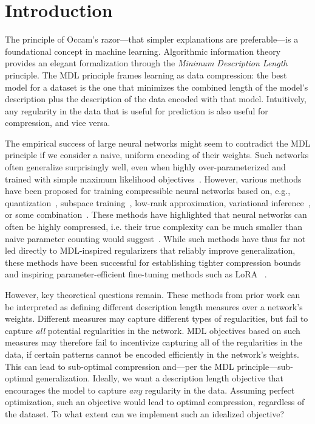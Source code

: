 \section{Introduction}


The principle of Occam's razor---that simpler explanations are preferable---is a foundational concept in machine learning. Algorithmic information theory provides an elegant formalization through the \emph{Minimum Description Length}~\citep[MDL;][]{rissanen1978modeling} principle. The MDL principle frames learning as data compression: the best model for a dataset is the one that minimizes the combined length of the model's description plus the description of the data encoded with that model. Intuitively, any regularity in the data that is useful for prediction is also useful for compression, and vice versa.

The empirical success of large neural networks might seem to contradict the MDL principle if we consider a naive, uniform encoding of their weights. Such networks often generalize surprisingly well, even when highly over-parameterized and trained with simple maximum likelihood objectives~\citep{zhang2017understanding}. However, various methods have been proposed for training compressible neural networks based on, e.g., quantization~\citep{han2016deep}, subspace training~\citep{li2018measuring}, low-rank approximation, variational inference~\citep{louizos2017bayesian,hinton1993keeping}, or some combination~\citep{lotfi2022pac,lotfi2024non,demoss2025complexity}. These methods have highlighted that neural networks can often be highly compressed, i.e. their true complexity can be much smaller than naive parameter counting would suggest~\citep{blier2018description}. While such methods have thus far not led directly to MDL-inspired regularizers that reliably improve generalization, these methods have been successful for establishing tighter compression bounds~\citep{lotfi2022pac,lotfi2024non} and inspiring parameter-efficient fine-tuning methods such as LoRA ~\citep{hu2022lora}.

However, key theoretical questions remain. These methods from prior work can be interpreted as defining different description length measures over a network's weights. Different measures may capture different types of regularities, but fail to capture \emph{all} potential regularities in the network. MDL objectives based on such measures may therefore fail to incentivize capturing all of the regularities in the data, if certain patterns cannot be encoded efficiently in the network's weights. This can lead to sub-optimal compression and---per the MDL principle---sub-optimal generalization. Ideally, we want a description length objective that encourages the model to capture \emph{any} regularity in the data. Assuming perfect optimization, such an objective would lead to optimal compression, regardless of the dataset. To what extent can we implement such an idealized objective?

